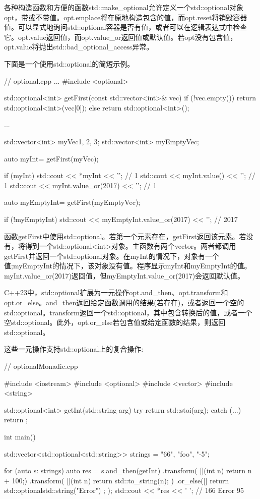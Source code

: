 各种构造函数和方便的函数std::make\_optional允许定义一个std::optional对象opt，带或不带值。opt.emplace将在原地构造包含的值，而opt.reset将销毁容器值。可以显式地询问std::optional容器是否有值，或者可以在逻辑表达式中检查它。opt.value返回值，而opt.value\_or返回值或默认值。若opt没有包含值，opt.value将抛出std::bad\_optional\_access异常。

下面是一个使用std::optional的简短示例。


\begin{cpp}
// optional.cpp
...
#include <optional>

std::optional<int> getFirst(const std::vector<int>& vec){
	if (!vec.empty()) return std::optional<int>(vec[0]);
	else return std::optional<int>();
}

...

std::vector<int> myVec{1, 2, 3};
std::vector<int> myEmptyVec;

auto myInt= getFirst(myVec);

if (myInt){
	std::cout << *myInt << '\n'; // 1
	std::cout << myInt.value() << '\n'; // 1
	std::cout << myInt.value_or(2017) << '\n'; // 1
}

auto myEmptyInt= getFirst(myEmptyVec);

if (!myEmptyInt){
	std::cout << myEmptyInt.value_or(2017) << '\n'; // 2017
}
\end{cpp}

函数getFirst中使用std::optional。若第一个元素存在，getFirst返回该元素。若没有，将得到一个std::optional<int>对象。主函数有两个vector。两者都调用getFirst并返回一个std::optional对象。在myInt的情况下，对象有一个值;myEmptyInt的情况下，该对象没有值。程序显示myInt和myEmptyInt的值。myInt.value\_or(2017)返回值，但myEmptyInt.value\_or(2017)会返回默认值。

C++23中，std::optional扩展为一元操作opt.and\_then、opt.transform和opt.or\_else。and\_then返回给定函数调用的结果(若存在)，或者返回一个空的std::optional。transform返回一个std::optional，其中包含转换后的值，或者一个空std::optional。此外，opt.or\_else若包含值或给定函数的结果，则返回std::optional。

这些一元操作支持std::optional上的复合操作:


\begin{cpp}
// optionalMonadic.cpp

#include <iostream>
#include <optional>
#include <vector>
#include <string>

std::optional<int> getInt(std::string arg) {
	try {
		return {std::stoi(arg)};
	}
	catch (...) {
		return { };
	}
}


int main() {

	std::vector<std::optional<std::string>> strings = {"66", "foo", "-5"};
	
	for (auto s: strings) {
		auto res = s.and_then(getInt)
					.transform( [](int n) { return n + 100;})
					.transform( [](int n) { return std::to_string(n); })
					.or_else([] { return std::optional{std::string("Error") }; });
		std::cout << *res << ' '; // 166 Error 95
	}

}
\end{cpp}

